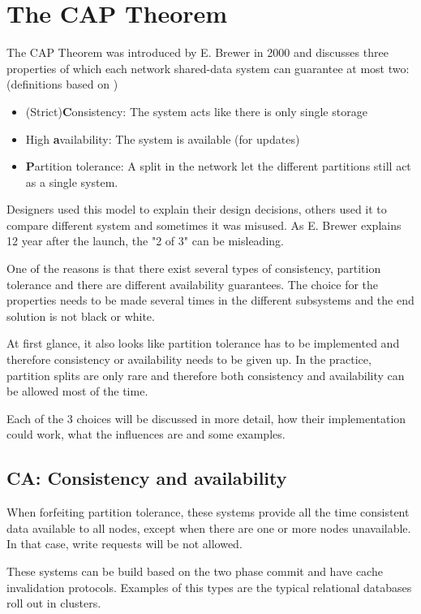 \documentclass[10pt,conference,letterpaper]{IEEEtran}
\begin{document}
\section{The CAP Theorem\cite{brewer2000towards}\cite{brewer2012cap}}\label{sec:CAPTheorem}
The CAP Theorem was introduced by E. Brewer \cite{brewer2000towards}  in 2000 and discusses three properties of which each network shared-data system can guarantee at most two: (definitions based on \cite{brewer2012cap})
\begin{itemize}
\item (Strict)\textbf{C}onsistency: The system acts like there is only single storage 
\item High \textbf{a}vailability: The system is available (for updates)
\item \textbf{P}artition tolerance: A split in the network let the different partitions still act as a single system. 
\end{itemize}
Designers used this model to explain their design decisions, others used it to compare different system and sometimes it was misused. As E. Brewer explains 12 year after the launch, the "2 of 3" can be misleading.

One of the reasons is that there exist several types of consistency, partition tolerance and there are different availability guarantees. The choice for the properties needs to be made several times in the different subsystems and the end solution is not black or white. 

At first glance, it also looks like partition tolerance has to be implemented and therefore consistency or availability needs to be given up. In the practice, partition splits are only rare and therefore both consistency and availability can be allowed most of the time. 

Each of the 3 choices will be discussed in more detail, how their implementation could work, what the influences are and some examples. 

\subsection{CA: Consistency and availability}
When forfeiting partition tolerance, these systems provide all the time consistent data available to all nodes, except when there are one or more nodes unavailable. In that case, write requests will be not allowed. 

These systems can be build based on the two phase commit and have cache invalidation protocols. Examples of this types are the typical relational databases roll out in clusters. 
\end{document}
